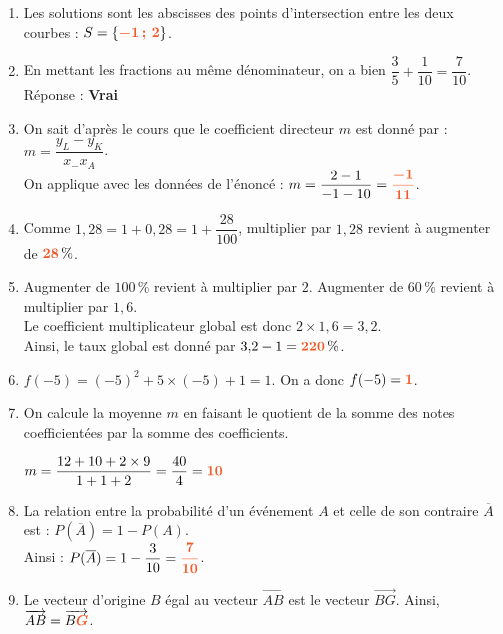\documentclass[a4paper,11pt]{article}
\begin{document}
\newpage \begin{seance}{} %

\begin{enumerate}
\item Les solutions sont les abscisses des points d'intersection entre les deux courbes :
   $S=\{{\color[HTML]{f15929}\boldsymbol{-1\,;\,2}}\}$. 
	\item En mettant les fractions au même dénominateur, on a bien $\dfrac{3}{5}+\dfrac{1}{10}=\dfrac{7}{10}$.
    Réponse : {\bfseries \color[HTML]{f15929}Vrai}
	\item On sait d'après le cours que le coefficient directeur $m$ est donné par : $m=\dfrac{y_L-y_K}{x_-x_A}$.\\On applique avec les données de l'énoncé :
        $m=\dfrac{2-1}{-1-10}=
        {\color[HTML]{f15929}\boldsymbol{\dfrac{-1}{11}}}$.
	\item Comme $1{,}28=1+0{,}28=1+\dfrac{28}{100}$, multiplier par $1{,}28$ revient à augmenter de ${\color[HTML]{f15929}\boldsymbol{28}}\,\%$. 
	\item Augmenter de $100\,\%$ revient à multiplier par $2$. Augmenter de $60\,\%$ revient à multiplier par $1{,}6$.\\
        Le coefficient multiplicateur global est donc $2\times 1{,}6=3{,}2$.\\
        Ainsi, le taux global est donné par $3{,}2-1={\color[HTML]{f15929}\boldsymbol{220}}\,\%$.
	\item $f(-5)=\left(-5 \right)^2 +5 \times \left(-5\right) +1 = 1$. 
    On a donc $f(-5)={\color[HTML]{f15929}\boldsymbol{1}}$.
	\item On calcule la moyenne $m$ en faisant le quotient de la somme des notes coefficientées par la somme des coefficients. \\
	\medskip
	
        $m=\dfrac{12+10+2\times 9}{1+1+2}=\dfrac{40}{4}={\color[HTML]{f15929}\boldsymbol{10}}$
	\item La relation entre la probabilité d'un événement $A$ et celle de son contraire $\overline{A}$ est :  $P(\overline{A})=1-P(A)$.\\
          Ainsi : $P(\overline{A})=1-\dfrac{3}{10}={\color[HTML]{f15929}\boldsymbol{\dfrac{7}{10}}}$.
	\item Le vecteur d'origine $B$ égal au  vecteur $\overrightarrow{AB}$ est le vecteur $\overrightarrow{BG}$. 
    Ainsi, $\overrightarrow{AB}=\overrightarrow{B{\color[HTML]{f15929}\boldsymbol{G}}}$.
	

\end{enumerate}
\end{seance}
\end{document}
